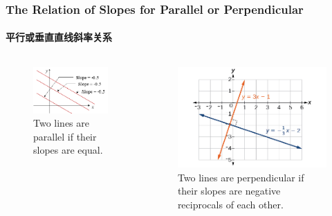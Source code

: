 \documentclass[
	11pt, %
	handout,
]{beamer}
\begin{document}
\begin{frame}
	\frametitle{The Relation of Slopes for Parallel or Perpendicular }
	\framesubtitle{平行或垂直直线斜率关系}

	\begin{columns}[t] 
		\begin{column}{0.5\textwidth} %

			\begin{figure}
		    \includegraphics[width=\linewidth]{Parallel_Slopes.png}
		    \caption{Two lines are parallel if their slopes are equal.}
	   \end{figure}
		\end{column}

		\begin{column}{0.5\textwidth} %
			\begin{figure}
		    \includegraphics[width=\linewidth]{Perpendicular_Slopes.jpeg}
		    \caption{Two lines are perpendicular if their slopes are negative reciprocals of each other.}
	   \end{figure}
    \end{column}
	\end{columns}
\end{frame}
\end{document}
